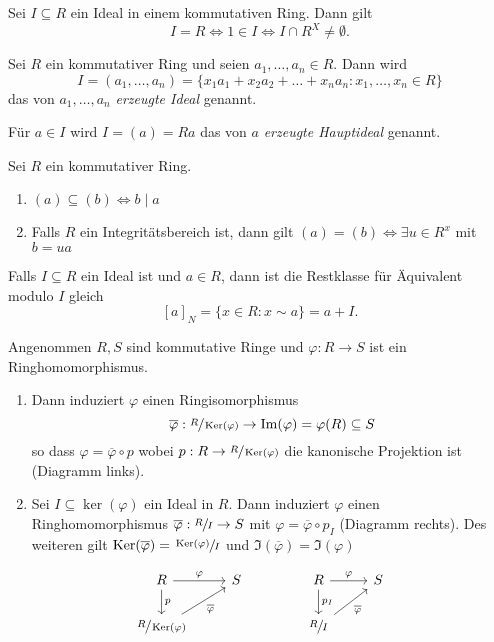 \begin{lemma}
	Sei $I \subseteq R$ ein Ideal in einem kommutativen Ring. Dann gilt 
	\[
	I = R \Leftrightarrow 1 \in I \Leftrightarrow I \cap R^{X} \neq \emptyset
	.\] 
\end{lemma}



\begin{definition}
	Sei $R$ ein kommutativer Ring und seien $a_1,\ldots,a_{n} \in R$. Dann wird
	\[
		I = (a_1,\ldots,a_{n}) = \{x_1 a_1 + x_2 a_2 + \ldots + x_{n} a_{n} : x_1,\ldots,x_{n} \in R\} 
	\] 
	das von $a_1,\ldots,a_{n}$ \emph{erzeugte Ideal} genannt.

	Für $a \in I$ wird $I = (a) = Ra$ das von $a$ \emph{erzeugte Hauptideal} genannt.
\end{definition}

\begin{lemma}
	Sei $R$ ein kommutativer Ring.
	\begin{enumerate}[1)]
		\item $(a) \subseteq (b) \Leftrightarrow b \mid a$ 
		\item Falls $R $ ein Integritätsbereich ist, dann gilt $(a) = (b) \Leftrightarrow \exists u \in R^{x}$ mit $b = ua$
	\end{enumerate}
\end{lemma}



Falls $I \subseteq R$ ein Ideal ist und $a \in R$, dann ist die Restklasse für Äquivalent modulo $I$ gleich
\[
	[a]_{N} = \{x \in R: x \sim a\} = a + I
.\] 

\begin{theorem}
	Angenommen $R,S$ sind kommutative Ringe und $\varphi: R  \to S$ ist ein Ringhomomorphismus.
	\begin{enumerate}
		\item Dann induziert $\varphi$ einen Ringisomorphismus
			\[
				\overline{\varphi}: \sfrac{R}{\operatorname{Ker}(\varphi)} \to \Im(\varphi) = \varphi(R) \subseteq S
			\] 
			so dass $\varphi = \overline{\varphi} \circ p$ wobei $p : R \to \sfrac{R}{\operatorname{Ker}(\varphi)}$ die kanonische Projektion ist (Diagramm links).
		\item Sei $I \subseteq \ker(\varphi)$ ein Ideal in $R$.
			Dann induziert $\varphi$ einen Ringhomomorphismus $\overline{\varphi}: \sfrac{R}{I} \to S$ mit $\varphi = \overline{\varphi} \circ p_{I}$ (Diagramm rechts).
			Des weiteren gilt $\operatorname{Ker}(\overline{\varphi}) = \sfrac{\operatorname{Ker}(\varphi)}{I}$ und $\Im(\overline{\varphi}) = \Im(\varphi)$
	\end{enumerate}
	\[
	\begin{tikzcd}
		R \arrow[d, "p"] \arrow[r, "\varphi"]                      & S \\
		\sfrac{R}{\ker(\varphi)} \arrow[ru, "\overline{\varphi}"'] &  
	\end{tikzcd}\qquad\qquad
	\begin{tikzcd}
		R \arrow[d, "p_{I}"] \arrow[r, "\varphi"]      & S \\
		\sfrac{R}{I} \arrow[ru, "\overline{\varphi}"'] &  
	\end{tikzcd}
	\]
\end{theorem}


